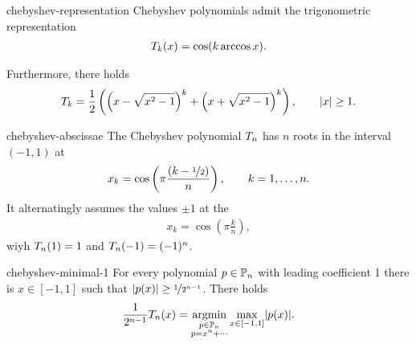 \begin{Lemma}{chebyshev-representation}
  Chebyshev polynomials admit the trigonometric representation
  \begin{gather}
    \pchebyshev_k(x) = \cos(k \operatorname{arccos} x).
  \end{gather}
  
  Furthermore, there holds
    \begin{gather}
    \pchebyshev_k = \frac12
    \left(
      \left(x-\sqrt{x^2-1}\right)^k
      +
      \left(x+\sqrt{x^2-1}\right)^k
    \right),\qquad\abs{x}\ge 1.
  \end{gather}
\end{Lemma}

\begin{Lemma}{chebyshev-abscissae}
  The Chebyshev polynomial $\pchebyshev_n$ has $n$ roots in the
  interval $(-1,1)$ at
  \begin{gather}
    x_k = \cos\left(\pi\frac{(k-\nicefrac12)}{n}\right),
    \qquad k=1,\dots,n.
  \end{gather}
  It alternatingly assumes the values $\pm1$ at the 
  \begin{gather}
    x_k = \cos\left(\pi\frac kn\right),
  \end{gather}
  wiyh $\pchebyshev_n(1) = 1$ and $\pchebyshev_n(-1) = (-1)^n$.
\end{Lemma}

\begin{Theorem}{chebyshev-minimal-1}
  For every polynomial $p\in \P_n$ with leading coefficient 1 there is $x\in[-1,1]$ such that $\abs{p(x)} \ge \nicefrac1{2^{n-1}}$. There holds
  \begin{gather}
   \frac1{2^{n-1}} \pchebyshev_n(x)
   = \operatorname*{arg min}_{\substack{p\in\P_n\\p = x^n+\cdots}}
   \max_{x\in[-1,1]}\abs{p(x)}.
  \end{gather}
\end{Theorem}

